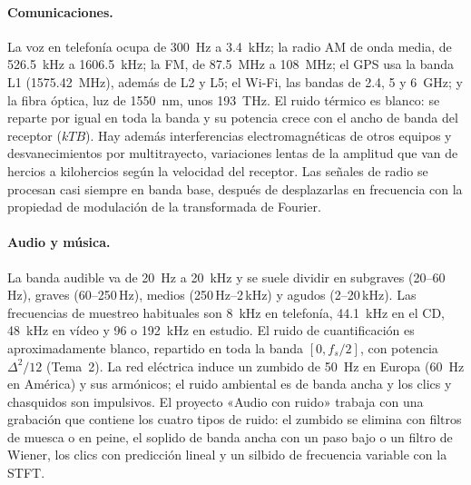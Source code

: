 \documentclass[11pt,a4paper]{scrartcl}
\begin{document}
\paragraph{Comunicaciones.} La voz en telefonía ocupa de \SI{300}{\hertz} a \SI{3,4}{\kilo\hertz}; la radio AM de onda media, de \SI{526,5}{\kilo\hertz} a \SI{1606,5}{\kilo\hertz}; la FM, de \SI{87,5}{\mega\hertz} a \SI{108}{\mega\hertz}; el GPS usa la banda L1 (\SI{1575,42}{\mega\hertz}), además de L2 y L5; el Wi-Fi, las bandas de \SI{2,4}{}, \SI{5}{} y \SI{6}{\giga\hertz}; y la fibra óptica, luz de \SI{1550}{\nano\metre}, unos \SI{193}{\tera\hertz}. El ruido térmico es blanco: se reparte por igual en toda la banda y su potencia crece con el ancho de banda del receptor ($kTB$). Hay además interferencias electromagnéticas de otros equipos y desvanecimientos por multitrayecto, variaciones lentas de la amplitud que van de hercios a kilohercios según la velocidad del receptor. Las señales de radio se procesan casi siempre en banda base, después de desplazarlas en frecuencia con la propiedad de modulación de la transformada de Fourier.

\paragraph{Audio y música.} La banda audible va de \SI{20}{\hertz} a \SI{20}{\kilo\hertz} y se suele dividir en subgraves (20–60\,Hz), graves (60–250\,Hz), medios (250\,Hz–2\,kHz) y agudos (2–20\,kHz). Las frecuencias de muestreo habituales son \SI{8}{\kilo\hertz} en telefonía, \SI{44,1}{\kilo\hertz} en el CD, \SI{48}{\kilo\hertz} en vídeo y 96 o \SI{192}{\kilo\hertz} en estudio. El ruido de cuantificación es aproximadamente blanco, repartido en toda la banda $[0,f_s/2]$, con potencia $\Delta^2/12$ (Tema~2). La red eléctrica induce un zumbido de \SI{50}{\hertz} en Europa (\SI{60}{\hertz} en América) y sus armónicos; el ruido ambiental es de banda ancha y los clics y chasquidos son impulsivos. El proyecto «Audio con ruido» trabaja con una grabación que contiene los cuatro tipos de ruido: el zumbido se elimina con filtros de muesca o en peine, el soplido de banda ancha con un paso bajo o un filtro de Wiener, los clics con predicción lineal y un silbido de frecuencia variable con la STFT.
\end{document}
